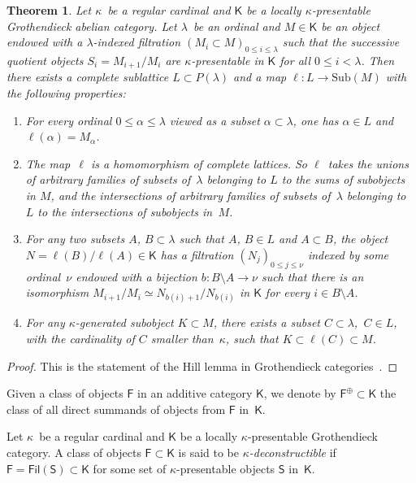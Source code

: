 \documentclass[12pt,a4paper]{amsart}
\newcommand{\+}{\protect\nobreakdash-}
\renewcommand{\:}{\colon}
\newcommand{\rarrow}{\longrightarrow}
\newcommand{\Fil}{\mathsf{Fil}}
\newcommand{\Sub}{\mathrm{Sub}}
\newcommand{\sF}{\mathsf F}
\newcommand{\sK}{\mathsf K}
\newcommand{\sS}{\mathsf S}
\theoremstyle{plain}
\newtheorem{thm}{Theorem}[section]
\theoremstyle{definition}
\begin{document}
\begin{thm} \label{hill-lemma-theorem}
 Let\/ $\kappa$~be a regular cardinal and\/ $\sK$ be a locally\/
$\kappa$\+presentable Grothendieck abelian category.
 Let\/ $\lambda$~be an ordinal and $M\in\sK$ be an object endowed
with a\/ $\lambda$\+indexed filtration
$(M_i\subset M)_{0\le i\le\lambda}$ such that the successive
quotient objects $S_i=M_{i+1}/M_i$ are\/ $\kappa$\+presentable
in\/ $\sK$ for all\/ $0\le i<\lambda$.
 Then there exists a complete sublattice $L\subset P(\lambda)$
and a map $\ell\:L\rarrow\Sub(M)$ with the following properties:
\begin{enumerate}
\renewcommand{\theenumi}{H\arabic{enumi}}
\item For every ordinal\/ $0\le\alpha\le\lambda$ viewed as a subset\/
$\alpha\subset\lambda$, one has\/ $\alpha\in L$ and
$\ell(\alpha)=M_\alpha$.
\item The map~$\ell$ is a homomorphism of complete lattices.
 So $\ell$~takes the unions of arbitrary families of subsets
of\/~$\lambda$ belonging to $L$ to the sums of subobjects in $M$,
and the intersections of arbitrary families of subsets of\/~$\lambda$
belonging to $L$ to the intersections of subobjects in~$M$.
\item For any two subsets $A$, $B\subset\lambda$ such that
$A$, $B\in L$ and $A\subset B$, the object $N=\ell(B)/\ell(A)\in\sK$
has a filtration $(N_j)_{0\le j\le\nu}$ indexed by some ordinal\/~$\nu$
endowed with a bijection $b\:B\setminus A\rarrow\nu$ such that
there is an isomorphism $M_{i+1}/M_i\simeq N_{b(i)+1}/N_{b(i)}$
in\/ $\sK$ for every $i\in B\setminus A$.
\item For any\/ $\kappa$\+generated subobject $K\subset M$,
there exists a subset $C\subset\lambda$, \,$C\in L$, with
the cardinality of $C$ smaller than~$\kappa$, such that
$K\subset\ell(C)\subset M$.
\end{enumerate}
\end{thm}

\begin{proof}
 This is the statement of the Hill lemma in Grothendieck
categories~\cite[Theorem~2.1]{Sto0}.
\end{proof}

 Given a class of objects $\sF$ in an additive category $\sK$,
we denote by $\sF^\oplus\subset\sK$ the class of all direct
summands of objects from $\sF$ in~$\sK$.

 Let $\kappa$~be a regular cardinal and $\sK$ be a locally
$\kappa$\+presentable Grothendieck category.
 A class of objects $\sF\subset\sK$ is said to be
\emph{$\kappa$\+deconstructible} if $\sF=\Fil(\sS)\subset\sK$
for some set of $\kappa$\+presentable objects $\sS$ in~$\sK$.
\end{document}
